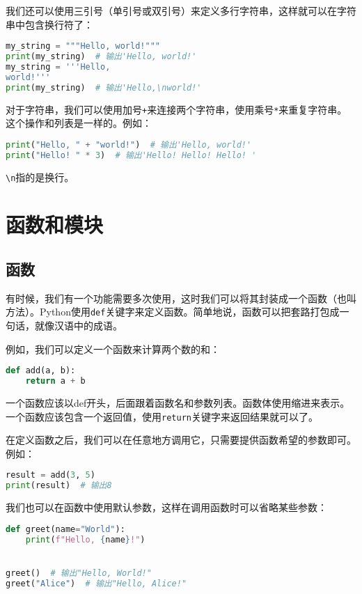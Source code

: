 \documentclass[../main.tex]{subfiles}
\begin{document}
我们还可以使用三引号（单引号或双引号）来定义多行字符串，这样就可以在字符串中包含换行符了：
\begin{lstlisting}[language=python]
my_string = """Hello, world!"""
print(my_string)  # 输出'Hello, world!'
my_string = '''Hello,
world!'''
print(my_string)  # 输出'Hello,\nworld!'
\end{lstlisting}

对于字符串，我们可以使用加号\texttt{+}来连接两个字符串，使用乘号\texttt{*}来重复字符串。这个操作和列表是一样的。例如：
\begin{lstlisting}[language=python]
print("Hello, " + "world!")  # 输出'Hello, world!'
print("Hello! " * 3)  # 输出'Hello! Hello! Hello! '
\end{lstlisting}

\texttt{\textbackslash n}指的是换行。

\section{函数和模块}\label{sec:functions-and-modules}

\subsection{函数}

有时候，我们有一个功能需要多次使用，这时我们可以将其封装成一个函数（也叫方法）。Python使用\texttt{def}关键字来定义函数。简单地说，函数可以把套路打包成一句话，就像汉语中的成语。

例如，我们可以定义一个函数来计算两个数的和：
\begin{lstlisting}[language=python]
def add(a, b):
    return a + b
\end{lstlisting}

一个函数应该以def开头，后面跟着函数名和参数列表。函数体使用缩进来表示。一个函数应该包含一个返回值，使用\texttt{return}关键字来返回结果就可以了。

在定义函数之后，我们可以在任意地方调用它，只需要提供函数希望的参数即可。例如：
\begin{lstlisting}[language=python]
result = add(3, 5)
print(result)  # 输出8  
\end{lstlisting}

我们也可以在函数中使用默认参数，这样在调用函数时可以省略某些参数：
\begin{lstlisting}[language=python]
def greet(name="World"):
    print(f"Hello, {name}!")


greet()  # 输出"Hello, World!"
greet("Alice")  # 输出"Hello, Alice!"
\end{lstlisting}
\end{document}

